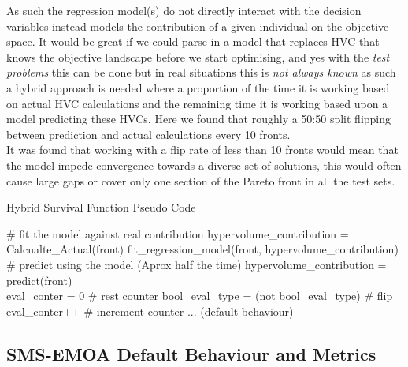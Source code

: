 \documentclass[sigconf,review,nonacm]{acmart}
\begin{document}
\noindent As such the regression model(s) do not directly interact with the decision variables instead models the contribution of a given individual on the objective space. 
It would be great if we could parse in a model that replaces HVC that knows the objective landscape before we start optimising, and yes with the \textit{test problems} this can be done but in real situations this is \textit{not always known} as such a hybrid approach is needed where a proportion of the time it is working based on actual HVC calculations and the remaining time it is working based upon a model predicting these HVCs. Here we found that roughly a 50:50 split flipping between prediction and actual calculations every 10 fronts. \\
It was found that working with a flip rate of less than 10 fronts would mean that the model impede convergence towards a diverse set of solutions, this would often cause large gaps or cover only one section of the Pareto front in all the test sets. 

\begin{algorithm}
	\caption{Hybrid Survival Function Pseudo Code} 
	\begin{algorithmic}[1]

                \State \# fit the model against real contribution 
                \State hypervolume\_contribution = Calcualte\_Actual(front)
                \State fit\_regression\_model(front, hypervolume\_contribution)
                \State \# predict using the model  (Aprox half the time)
                \State hypervolume\_contribution = predict(front)       
            \EndIf \\
            
                \State eval\_conter = 0                                \# rest counter
                \State bool\_eval\_type = (not bool\_eval\_type)       \# flip 
            \Else
                \State eval\_conter++                                  \# increment counter 
            \EndIf
            ... (default behaviour)
	\end{algorithmic} 
\end{algorithm}

 \subsection{SMS-EMOA Default Behaviour and Metrics}
\end{document}
